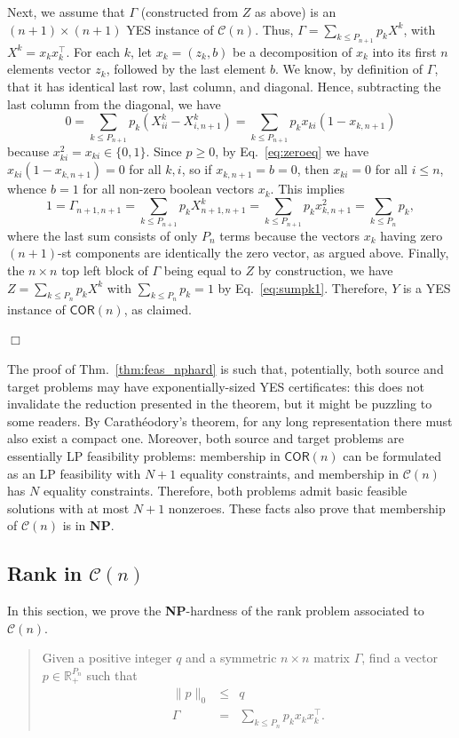 \documentclass[envcountsect,envcountsame]{svjour3}
\theoremstyle{changebreak}                %
\newenvironment{proof}
 {{\sl Proof.}\hspace*{1 ex}}%
 {{\nopagebreak\hspace*{\fill}$\Box$\par\vspace{12pt}}}
\newcommand{\transpose}[1]{{#1}^{\top}}
\newcommand{\CONX}[1]{\mathcal{C}(#1)}
\begin{document}
\begin{proof}
Next, we assume that $\Gamma$ (constructed from $Z$ as above) is an $(n+1)\times (n+1)$ YES instance of $\CONX{n}$. Thus, $\Gamma=\sum_{k\le P_{n+1}} p_k X^k$, with $X^k=x_k\transpose{x}_k$. For each $k$, let $x_k=(z_k,b)$ be a decomposition of $x_k$ into its first $n$ elements vector $z_k$, followed by the last element $b$. We know, by definition of $\Gamma$, that it has identical last row, last column, and diagonal. Hence, subtracting the last column from the diagonal, we have
\begin{equation}
  0=\sum_{k\le P_{n+1}} p_k(X^k_{ii} - X^k_{i,n+1})=\sum_{k\le P_{n+1}} p_k x_{ki}(1-x_{k,n+1})
  \label{eq:zeroeq}
\end{equation}
because $x_{ki}^2=x_{ki}\in\{0,1\}$. Since $p\ge 0$, by Eq.~\eqref{eq:zeroeq} we have $x_{ki}(1-x_{k,n+1})=0$ for all $k,i$, so if $x_{k,n+1}=b=0$, then $x_{ki}=0$ for all $i\le n$, whence $b=1$ for all non-zero boolean vectors $x_k$. This implies 
\begin{equation}
  1=\Gamma_{n+1,n+1}=\sum_{k\le P_{n+1}} p_k X^k_{n+1,n+1}=\sum_{k\le P_{n+1}} p_k x_{k,n+1}^2=\sum_{k\le P_n} p_k, 
  \label{eq:sumpk1}
\end{equation}
where the last sum consists of only $P_n$ terms because the vectors $x_k$ having zero $(n+1)$-st components are identically the zero vector, as argued above. Finally, the $n\times n$ top left block of $\Gamma$ being equal to $Z$ by construction, we have $Z=\sum_{k\le P_n} p_k X^k$ with $\sum_{k\le P_n} p_k=1$ by Eq.~\eqref{eq:sumpk1}. Therefore, $Y$ is a YES instance of $\mathsf{COR}(n)$, as claimed.
\end{proof}
The proof of Thm.~\ref{thm:feas_nphard} is such that, potentially, both source and target problems may have exponentially-sized YES certificates: this does not invalidate the reduction presented in the theorem, but it might be puzzling to some readers. By Carath\'eodory's theorem, for any long representation there must also exist a compact one. Moreover, both source and target problems are essentially LP feasibility problems: membership in $\mathsf{COR}(n)$ can be formulated as an LP feasibility with $N+1$ equality constraints, and membership in $\CONX{n}$ has $N$ equality constraints. Therefore, both problems admit basic feasible solutions with at most $N+1$ nonzeroes. These facts also prove that membership of $\CONX{n}$ is in \textbf{NP}. 

\subsection{Rank in $\CONX{n}$}
\label{s:rank}
In this section, we prove the \textbf{NP}-hardness of the rank problem associated to $\CONX{n}$.
\begin{quote}
  Given a positive integer $q$ and a symmetric $n\times n$ matrix $\Gamma$, find a vector $p\in\mathbb{R}^{P_n}_+$ such that
  \begin{eqnarray}
    \|p\|_0 &\le& q \label{eq:rk1} \\
    \Gamma &=& \sum_{k\le P_n} p_k x_k\transpose{x}_k. \label{eq:rk2}
\end{eqnarray}
\end{quote}
\end{document}
